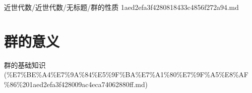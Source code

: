 \begin{note}[来源路径]

近世代数/近世代数/无标题/群的性质 1aed2efa3f4280818433c4856f272a94.md

\end{note}

\section*{群的意义}

\begin{note}[来源上级主题]

群的基础知识 (\%E7\%BE\%A4\%E7\%9A\%84\%E5\%9F\%BA\%E7\%A1\%80\%E7\%9F\%A5\%E8\%AF\%86\%201aed2efa3f428009ac4eca74062880ff.md)

\end{note}

